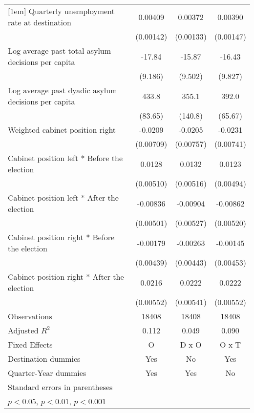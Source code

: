 \begin{table}[htbp]
\begin{tabular}{l*{3}{c}}
[1em]
Quarterly unemployment rate at destination&     0.00409\sym{**} &     0.00372\sym{**} &     0.00390\sym{*}  \\
                    &   (0.00142)         &   (0.00133)         &   (0.00147)         \\
[1em]
Log average past total asylum decisions per capita&      -17.84         &      -15.87         &      -16.43         \\
                    &     (9.186)         &     (9.502)         &     (9.827)         \\
[1em]
Log average past dyadic asylum decisions per capita&       433.8\sym{***}&       355.1\sym{*}  &       392.0\sym{***}\\
                    &     (83.65)         &     (140.8)         &     (65.67)         \\
[1em]
Weighted cabinet position right&     -0.0209\sym{**} &     -0.0205\sym{**} &     -0.0231\sym{**} \\
                    &   (0.00709)         &   (0.00757)         &   (0.00741)         \\
[1em]
Cabinet position left * Before the election&      0.0128\sym{*}  &      0.0132\sym{*}  &      0.0123\sym{*}  \\
                    &   (0.00510)         &   (0.00516)         &   (0.00494)         \\
[1em]
Cabinet position left * After the election&    -0.00836         &    -0.00904         &    -0.00862         \\
                    &   (0.00501)         &   (0.00527)         &   (0.00520)         \\
[1em]
Cabinet position right * Before the election&    -0.00179         &    -0.00263         &    -0.00145         \\
                    &   (0.00439)         &   (0.00443)         &   (0.00453)         \\
[1em]
Cabinet position right * After the election&      0.0216\sym{***}&      0.0222\sym{***}&      0.0222\sym{***}\\
                    &   (0.00552)         &   (0.00541)         &   (0.00552)         \\
\hline
Observations        &       18408         &       18408         &       18408         \\
Adjusted \(R^{2}\)  &       0.112         &       0.049         &       0.090         \\
Fixed Effects       &           O         &       D x O         &       O x T         \\
Destination dummies &         Yes         &          No         &         Yes         \\
Quarter-Year dummies&         Yes         &         Yes         &          No         \\
\hline\hline
\multicolumn{4}{l}{\footnotesize Standard errors in parentheses}\\
\multicolumn{4}{l}{\footnotesize \sym{*} \(p<0.05\), \sym{**} \(p<0.01\), \sym{***} \(p<0.001\)}\\
\end{tabular}
\end{table}
